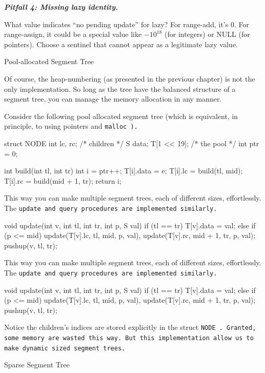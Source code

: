 \bf \it Pitfall 4: Missing lazy identity.\rm

What value indicates ``no pending update'' for lazy? For range-add, it's 0. For range-assign, it could be a special value like $-10^{18}$ (for integers) or NULL (for pointers). Choose a sentinel that cannot appear as a legitimate lazy value.

\fi


\secc Pool-allocated Segment Tree

Of course, the heap-numbering (as presented in the previous chapter) is not the only implementation.  So long as the tree have the balanced structure of a segment tree, you can manage the memory allocation in any manner.

Consider the following pool allocated segment tree (which is equivalent, in principle, to using pointers and \tt malloc \rm).

\begtt
struct NODE {
    int lc, rc; /* children */
    S data;
  } T[1 << 19]; /* the pool */
int ptr = 0;

int build(int tl, int tr) {
    int i = ptr++;
    T[i].data = e;
    T[i].lc = build(tl, mid);         T[i].rc = build(mid + 1, tr);
    return i;
  }

This way you can make multiple segment trees, each of different sizes, effortlessly.  The \tt update \rm and \tt query \rm procedures are implemented similarly.

\begtt
void update(int v, int tl, int tr, int p, S val) {
    if (tl == tr)    T[v].data = val;
    else {
        if (p <= mid) {
            update(T[v].lc, tl, mid, p, val),
            update(T[v].rc, mid + 1, tr, p, val);
          }
        pushup(v, tl, tr);
      }
  }
\endtt

This way you can make multiple segment trees, each of different sizes, effortlessly.  The \tt update \rm and \tt query \rm procedures are implemented similarly.

\begtt
void update(int v, int tl, int tr, int p, S val) {
    if (tl == tr)    T[v].data = val;
    else {
        if (p <= mid) {
            update(T[v].lc, tl, mid, p, val),
            update(T[v].rc, mid + 1, tr, p, val);
          }
        pushup(v, tl, tr);
      }
  }
\endtt

Notice the children's indices are stored explicitly in the struct \tt NODE \rm.  Granted, some memory are wasted this way.  But this implementation allow us to make dynamic sized segment trees.

\secc Sparse Segment Tree

